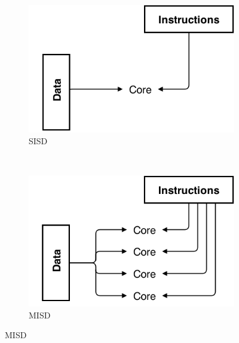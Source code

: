 \documentclass[10pt,a4paper]{report}
\begin{document}
\begin{figure}
        \centering
        \begin{subfigure}[b]{0.48\textwidth}
                \includegraphics[width=\textwidth]{SISD}
                \caption{SISD}
                \label{fig:SISD}
        \end{subfigure}%
        ~
        \begin{subfigure}[b]{0.48\textwidth}
                \includegraphics[width=\textwidth]{MISD}
                \caption{MISD}
                \label{fig:MISD}
        \end{subfigure}


\end{figure}
\end{document}
